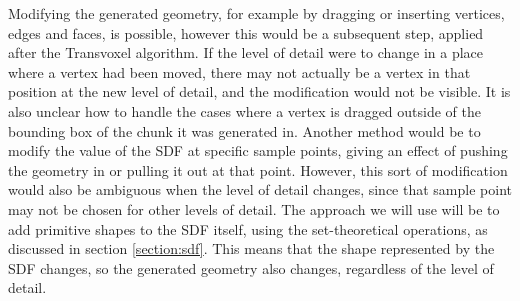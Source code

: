 \documentclass[11pt]{article}
\begin{document}
Modifying the generated geometry, for example by dragging or inserting vertices, edges and faces, is possible, however this would be a subsequent step, applied after the Transvoxel algorithm. If the level of detail were to change in a place where a vertex had been moved, there may not actually be a vertex in that position at the new level of detail, and the modification would not be visible. It is also unclear how to handle the cases where a vertex is dragged outside of the bounding box of the chunk it was generated in. 
Another method would be to modify the value of the SDF at specific sample points, giving an effect of pushing the geometry in or pulling it out at that point. However, this sort of modification would also be ambiguous when the level of detail changes, since that sample point may not be chosen for other levels of detail. 
The approach we will use will be to add primitive shapes to the SDF itself, using the set-theoretical operations, as discussed in section \ref{section:sdf}. This means that the shape represented by the SDF changes, so the generated geometry also changes, regardless of the level of detail.
\end{document}

